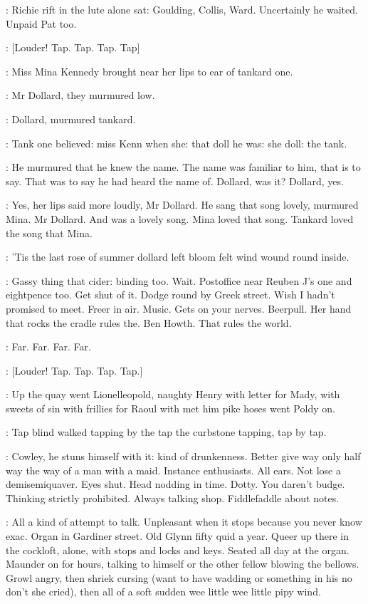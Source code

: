 :
Richie rift in the lute alone sat:
Goulding,
Collis,
Ward.
Uncertainly
he waited.
Unpaid Pat too.

\stripling:
[Louder!
Tap.
Tap.
Tap.
Tap]

:
Miss Mina Kennedy brought near her lips to ear of tankard one.

:
Mr Dollard,
they murmured low.

:
Dollard,
murmured tankard.

:
Tank one believed:
miss Kenn when she:
that doll he was:
she doll:
the tank.

:
He murmured that he knew the name.
The name was familiar to him,
that is to say.
That was to say he had heard the name of.
Dollard,
was it?
Dollard,
yes.

:
Yes,
her lips said more loudly,
Mr Dollard.
He sang that song lovely,
murmured Mina.
Mr Dollard.
And
 was a lovely
song.
Mina loved that song.
Tankard loved the song that Mina.

:
'Tis the last rose of summer dollard left bloom felt wind wound round
inside.

\BloomInt:
Gassy thing that cider:
binding too.
Wait.
Postoffice near Reuben J's
one and eightpence too.
Get shut of it.
Dodge round by Greek street.
Wish
I hadn't promised to meet.
Freer in air.
Music.
Gets on your nerves.
Beerpull.
Her hand that rocks the cradle rules the.
Ben Howth.
That rules
the world.

:
Far.
Far.
Far.
Far.

\stripling:
[Louder!
Tap.
Tap.
Tap.
Tap.]

:
Up the quay went Lionelleopold,
naughty Henry with letter for
Mady,
with sweets of sin with frillies for Raoul with met him pike hoses
went Poldy on.

:
Tap blind walked
tapping by the tap the curbstone tapping,
tap by tap.

\BloomInt:
Cowley,
he stuns himself with it:
kind of drunkenness.
Better give
way only half way the way of a man with a maid.
Instance enthusiasts.
All
ears.
Not lose a demisemiquaver.
Eyes shut.
Head nodding in time.
Dotty.
You daren't budge.
Thinking strictly prohibited.
Always talking shop.
Fiddlefaddle about notes.

\BloomInt:
All a kind of attempt to talk.
Unpleasant when it stops because you
never know exac.
Organ in Gardiner street.
Old Glynn fifty quid a year.
Queer up there in the cockloft,
alone,
with stops and locks and keys.
Seated all day at the organ.
Maunder on for hours,
talking to himself or
the other fellow blowing the bellows.
Growl angry,
then shriek cursing
(want to have wadding or something in his no don't she cried),
then all of
a soft sudden wee little wee little pipy wind.

